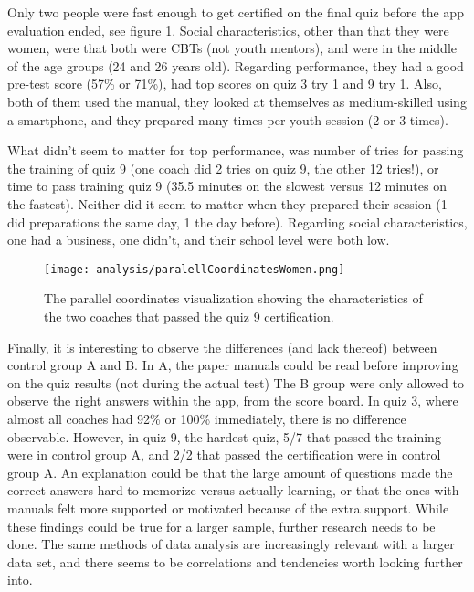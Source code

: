 Only two people were fast enough to get certified on the final quiz before the app evaluation ended, see figure \ref{fig:quiz9pl}. Social characteristics, other than that they were women, were that both were CBTs (not youth mentors), and were in the middle of the age groups (24 and 26 years old). Regarding performance, they had a good pre-test score (57\% or 71\%), had top scores on quiz 3 try 1 and 9 try 1. Also, both of them used the manual, they looked at themselves as medium-skilled using a smartphone, and they prepared many times per youth session (2 or 3 times).

What didn't seem to matter for top performance, was number of tries for passing the training of quiz 9 (one coach did 2 tries on quiz 9, the other 12 tries!), or time to pass training quiz 9 (35.5 minutes on the slowest versus 12 minutes on the fastest). Neither did it seem to matter when they prepared their session (1 did preparations the same day, 1 the day before). Regarding social characteristics, one had a business, one didn't, and their school level were both low.

\begin{figure}[h]
    \centering
    \texttt{[image: analysis/paralellCoordinatesWomen.png]}
    \caption{The parallel coordinates visualization showing the characteristics of the two coaches that passed the quiz 9 certification.}
    \label{fig:quiz9pl}
\end{figure}

Finally, it is interesting to observe the differences (and lack thereof) between control group A and B. In A, the paper manuals could be read before improving on the quiz results (not during the actual test) The B group were only allowed to observe the right answers within the app, from the score board. In quiz 3, where almost all coaches had 92\% or 100\% immediately, there is no difference observable. However, in quiz 9, the hardest quiz, 5/7 that passed the training were in control group A, and 2/2 that passed the certification were in control group A. An explanation could be that the large amount of questions made the correct answers hard to memorize versus actually learning, or that the ones with manuals felt more supported or motivated because of the extra support. While these findings could be true for a larger sample, further research needs to be done. The same methods of data analysis are increasingly relevant with a larger data set, and there seems to be correlations and tendencies worth looking further into.
